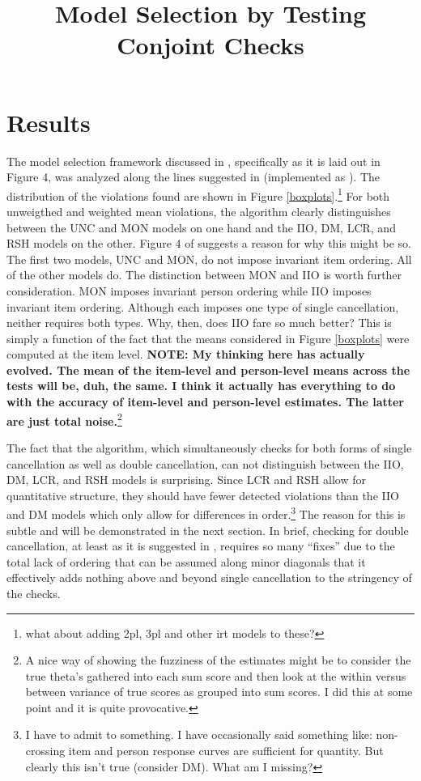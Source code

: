 \documentclass[12pt]{article}
\title{Model Selection by Testing Conjoint Checks}
\date{}
\begin{document}
\maketitle
\section{Results}
The model selection framework discussed in , specifically as it is laid out in Figure 4, was analyzed along the lines suggested in  (implemented as ). The distribution of the violations found are shown in Figure \ref{boxplots}.\footnote{what about adding 2pl, 3pl and other irt models to these?} For both unweigthed and weighted mean violations, the algorithm clearly distinguishes between the UNC and MON models on one hand and the IIO, DM, LCR, and RSH models on the other. Figure 4 of  suggests a reason for why this might be so. The first two models, UNC and MON, do not impose invariant item ordering. All of the other models do. The distinction between MON and IIO is worth further consideration. MON imposes invariant person ordering while IIO imposes invariant item ordering. Although each imposes one type of single cancellation, neither requires both types. Why, then, does IIO fare so much better? This is simply a function of the fact that the means considered in Figure \ref{boxplots} were computed at the item level. {\bf NOTE: My thinking here has actually evolved. The mean of the item-level and person-level means across the tests will be, duh, the same. I think it actually has everything to do with the accuracy of item-level and person-level estimates. The latter are just total noise.}\footnote{A nice way of showing the fuzziness of the estimates might be to consider the true theta's gathered into each sum score and then look at the within versus between variance of true scores as grouped into sum scores. I did this at some point and it is quite provocative.}

The fact that the algorithm, which simultaneously checks for both forms of single cancellation as well as double cancellation, can not distinguish between the IIO, DM, LCR, and RSH models is surprising. Since LCR and RSH allow for quantitative structure, they should have fewer detected violations than the IIO and DM models which only allow for differences in order.\footnote{I have to admit to something. I have occasionally said something like: non-crossing item and person response curves are sufficient for quantity. But clearly this isn't true (consider DM). What am I missing?} The reason for this is subtle and will be demonstrated in the next section. In brief, checking for double cancellation, at least as it is suggested in , requires so many ``fixes'' due to the total lack of ordering that can be assumed along minor diagonals that it effectively adds nothing above and beyond single cancellation to the stringency of the checks.
\end{document}
